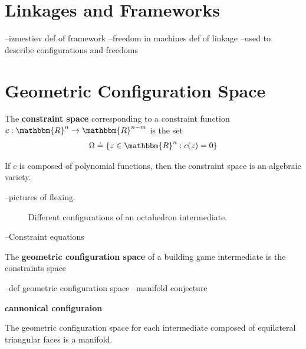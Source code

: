 \section{Linkages and Frameworks}
--izmestiev def of framework
--freedom in machines def of linkage
--used to describe configurations and freedoms 
\section{Geometric Configuration Space}
\begin{mydef}
The \textbf{constraint space} corresponding to a constraint function $c: \mathbbm{R}^n \to \mathbbm{R}^{n-m}$ is the set
\begin{align}
\Omega \doteq \{z \in \mathbbm{R}^n : c(z) = 0\}
\end{align}
\end{mydef}
If $c$ is composed of polynomial functions, then the constraint space is an algebraic variety. 


 --pictures of flexing. 
\begin{figure}[ht]
\caption{Different configurations of an octahedron intermediate.}
\label{fig:OctaGCS}
\end{figure}


--Constraint equations


\begin{mydef}
The \textbf{geometric configuration space} of a building game intermediate is the constraints space 
\end{mydef}
--def geometric configuration space
--manifold conjecture


\begin{mydef}
\textbf{cannonical configuraion}
\end{mydef}

\begin{mycon}
The geometric configuration space for each intermediate composed of equilateral triangular faces is a manifold.
\end{mycon}

%

